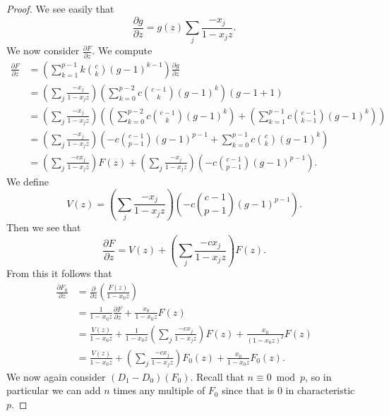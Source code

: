\documentclass{amsart}
\numberwithin{equation}{section}
\theoremstyle{definition}
\begin{document}
\begin{proof}
We see easily that 
\[
\frac{\partial g}{\partial z} = g(z) \sum_j \frac{-x_j}{1-x_jz}.
\]
We now consider $\frac{\partial F}{\partial z}$. We compute
\begin{align*}
\frac{\partial F}{\partial z}%
&=\left(\sum_{k=1}^{p-1}k\binom{c}{k}(g-1)^{k-1}\right)\frac{\partial g}{\partial z}\\
&=\left(\sum_j \frac{-x_j}{1-x_jz}\right)\left(\sum_{k=0}^{p-2}c\binom{c-1}{k}(g-1)^{k}\right)(g-1+1)\\
&=\left(\sum_j \frac{-x_j}{1-x_jz}\right)\left(\left(\sum_{k=0}^{p-2}c\binom{c-1}{k}(g-1)^{k}\right)+\left(\sum_{k=1}^{p-1}c\binom{c-1}{k-1}(g-1)^{k}\right)\right)\\
&=\left(\sum_j \frac{-x_j}{1-x_jz}\right)\left(-c\binom{c-1}{p-1}(g-1)^{p-1}+\sum_{k=0}^{p-1}c\binom{c}{k}(g-1)^{k}\right)\\
&=\left(\sum_j \frac{-cx_j}{1-x_jz}\right)F(z)+\left(\sum_j \frac{-x_j}{1-x_jz}\right)\left(-c\binom{c-1}{p-1}(g-1)^{p-1}\right).
\end{align*}
We define 
\[
V(z)=\left(\sum_j \frac{-x_j}{1-x_jz}\right)\left(-c\binom{c-1}{p-1}(g-1)^{p-1}\right).
\]
Then we see that 
\[
\frac{\partial F}{\partial z}=V(z)+\left(\sum_j \frac{-cx_j}{1-x_jz}\right)F(z).
\]
From this it follows that
\begin{align*}
\frac{\partial F_0}{\partial z} &= \frac{\partial}{\partial z}\left(\frac{F(z)}{1-x_0z}\right)\\
&=\frac{1}{1-x_0z} \frac{\partial F}{\partial z}+\frac{x_0}{1-x_0z} F(z)\\
&=\frac{V(z)}{1-x_0z}+\frac{1}{1-x_0z}\left(\sum_j \frac{-cx_j}{1-x_jz}\right)F(z)+\frac{x_0}{(1-x_0z)^2} F(z)\\
&=\frac{V(z)}{1-x_0z}+\left(\sum_j \frac{-cx_j}{1-x_jz}\right)F_0(z)+\frac{x_0}{1-x_0z} F_0(z).
\end{align*}
We now again consider $(D_1-D_0)(F_0)$. Recall that $n \equiv 0 \bmod p$, so in particular we can add $n$ times any multiple of $F_0$ since that is $0$ in characteristic $p$. 

\end{proof}
\end{document}
